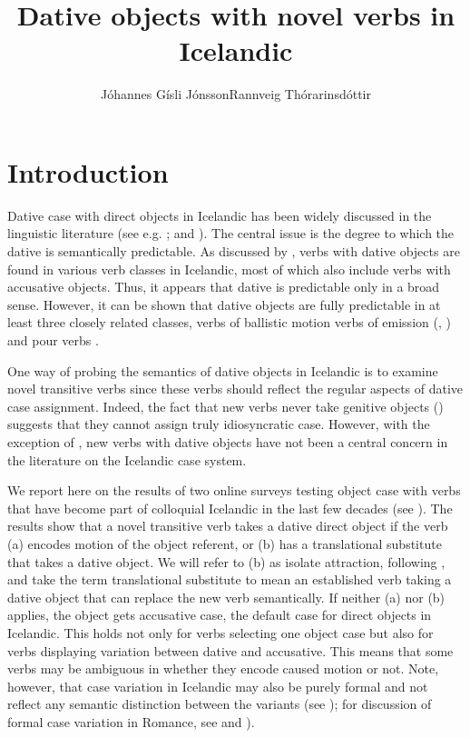 \documentclass[output=paper,modfonts,nonflat,colorlinks,citecolor=brown]{langsci/langscibook}
\author{Jóhannes Gísli Jónsson\affiliation{Unversity of Iceland}\lastand Rannveig Thórarinsdóttir\affiliation{Unversity of Iceland}}
\title{Dative objects with novel verbs in Icelandic}
\begin{document}
\maketitle

\section{Introduction} %
\label{sec:jonsson:1}

Dative case with direct objects in Icelandic has been widely discussed in the linguistic literature (see e.g. \citealt{YipEtAl1987,Barðdal2001,Barðdal2008,Svenonius2002,Maling2002}; and \citealt{Jónsson2013a}). The central issue is the degree to which the dative is semantically predictable. As discussed by \citet{Maling2002}, verbs with dative objects are found in various verb classes in Icelandic, most of which also include verbs with accusative objects. Thus, it appears that dative is predictable only in a broad sense. However, it can be shown that dative objects are fully predictable in at least three closely related classes, verbs of ballistic motion \citep{Svenonius2002} verbs of emission (\citealt{Maling2002}, \citealt{Jónsson2013a}) and pour verbs \citep{Jónsson2013a}.

One way of probing the semantics of dative objects in Icelandic is to examine novel transitive verbs since these verbs should reflect the regular aspects of dative case assignment. Indeed, the fact that new verbs never take genitive objects (\citealt{JónssonEythórsson2011}) suggests that they cannot assign truly idiosyncratic case. However, with the exception of \citet{Barðdal2001,Barðdal2008}, new verbs with dative objects have not been a central concern in the literature on the Icelandic case system.

We report here on the results of two online surveys testing object case with verbs that have become part of colloquial Icelandic in the last few decades (see \citealt{Thórarinsdóttir2015}). The results show that a novel transitive verb takes a dative direct object if the verb (a) encodes motion of the object referent, or (b) has a translational substitute that takes a dative object. We will refer to (b) as isolate attraction, following \citet{Barðdal2001}, and take the term translational substitute to mean an established verb taking a dative object that can replace the new verb semantically. If neither (a) nor (b) applies, the object gets accusative case, the default case for direct objects in Icelandic. This holds not only for verbs selecting one object case but also for verbs displaying variation between dative and accusative. This means that some verbs may be ambiguous in whether they encode caused motion or not. Note, however, that case variation in Icelandic may also be purely formal and not reflect any semantic distinction between the variants (see \citealt{Jónsson2013b}); for discussion of formal case variation in Romance, see  and ).
\end{document}
